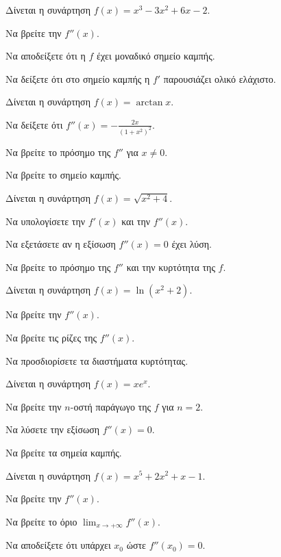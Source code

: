\documentclass[11pt,a4paper,modern]{FFExercises}
\begin{document}
\askhsh
Δίνεται η συνάρτηση $f(x) = x^3 - 3x^2 + 6x - 2$.
\begin{alist}
    \item Να βρείτε την $f''(x)$.
    \item Να αποδείξετε ότι η $f$ έχει μοναδικό σημείο καμπής.
    \item Να δείξετε ότι στο σημείο καμπής η $f'$ παρουσιάζει ολικό ελάχιστο.
\end{alist}

\askhsh
Δίνεται η συνάρτηση $f(x) = \arctan x$.
\begin{alist}
    \item Να δείξετε ότι $f''(x) = -\frac{2x}{(1+x^2)^2}$.
    \item Να βρείτε το πρόσημο της $f''$ για $x \ne 0$.
    \item Να βρείτε το σημείο καμπής.
\end{alist}

\askhsh
Δίνεται η συνάρτηση $f(x) = \sqrt{x^2+4}$.
\begin{alist}
    \item Να υπολογίσετε την $f'(x)$ και την $f''(x)$.
    \item Να εξετάσετε αν η εξίσωση $f''(x)=0$ έχει λύση.
    \item Να βρείτε το πρόσημο της $f''$ και την κυρτότητα της $f$.
\end{alist}

\askhsh
Δίνεται η συνάρτηση $f(x) = \ln(x^2+2)$.
\begin{alist}
    \item Να βρείτε την $f''(x)$.
    \item Να βρείτε τις ρίζες της $f''(x)$.
    \item Να προσδιορίσετε τα διαστήματα κυρτότητας.
\end{alist}

\askhsh
Δίνεται η συνάρτηση $f(x) = xe^x$.
\begin{alist}
    \item Να βρείτε την $n$-οστή παράγωγο της $f$ για $n=2$.
    \item Να λύσετε την εξίσωση $f''(x)=0$.
    \item Να βρείτε τα σημεία καμπής.
\end{alist}

\askhsh
Δίνεται η συνάρτηση $f(x) = x^5 + 2x^2 + x - 1$.
\begin{alist}
    \item Να βρείτε την $f''(x)$.
    \item Να βρείτε το όριο $\lim_{x\to +\infty}f''(x)$.
    \item Να αποδείξετε ότι υπάρχει $x_0$ ώστε $f''(x_0)=0$.
\end{alist}
\end{document}

